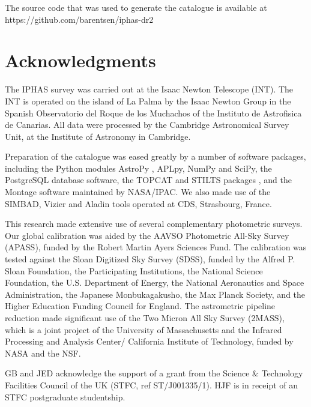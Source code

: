 \documentclass[useAMS,usenatbib]{mn2e}
\begin{document}
The source code that was used to generate
the catalogue is available at
https://github.com/barentsen/iphas-dr2

\section*{Acknowledgments}

The IPHAS survey was carried out 
at the Isaac Newton Telescope (INT).
The INT is operated on the island of La Palma
by the Isaac Newton Group
in the Spanish Observatorio del Roque de los Muchachos
of the Instituto de Astrofisica de Canarias.
All data were processed 
by the Cambridge Astronomical Survey Unit,
at the Institute of Astronomy in Cambridge.

Preparation of the catalogue was eased greatly
by a number of software packages,
including the Python modules
AstroPy \citep{Astropy},
APLpy, NumPy and SciPy,
the PostgreSQL database software,
the TOPCAT and STILTS packages \citep{Taylor2005,Taylor2006},
and the Montage software maintained by NASA/IPAC.
We also made use of the SIMBAD, Vizier and Aladin \citep{Aladin} tools operated at CDS, Strasbourg, France.

This research made extensive use of
several complementary photometric surveys.
Our global calibration was aided
by the AAVSO Photometric All-Sky Survey (APASS),
funded by the Robert Martin Ayers Sciences Fund.
The calibration was tested against the
Sloan Digitized Sky Survey (SDSS),
funded by the Alfred P. Sloan Foundation, the Participating Institutions, the National Science Foundation, the U.S. Department of Energy, the National Aeronautics and Space Administration, the Japanese Monbukagakusho, the Max Planck Society, and the Higher Education Funding Council for England.
The astrometric pipeline reduction made
significant use of the Two Micron All Sky Survey (2MASS),
which is a joint project 
of the University of Massachusetts
and the Infrared Processing and Analysis Center/
California Institute of Technology,
funded by NASA and the NSF.

GB and JED acknowledge the support of a grant
from the Science \& Technology Facilities Council
of the UK (STFC, ref ST/J001335/1).
HJF is in receipt of an STFC postgraduate studentship.




\appendix

\end{document}
